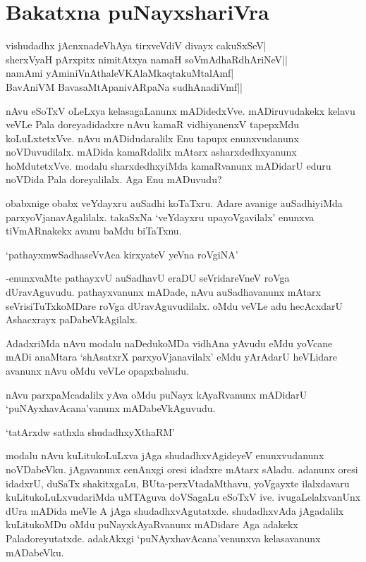 \chapter{Bakatxna puNayxshariVra}

\begin{shloka}
vishudadhx jAcnxnadeVhAya tirxveVdiV divayx cakuSxSeV|\\
sherxVyaH pArxpitx nimitAtxya namaH soVmAdhaRdhAriNeV||\\
namAmi yAminiVnAthaleVKAlaMkaqtakuMtalAmf|\\
BavAniVM BavasaMtApanivARpaNa sudhAnadiVmf||
\end{shloka}

nAvu eSoTxV oLeLxya kelasagaLanunx mADidedxVve. mADiruvudakekx kelavu veVLe Pala doreyadidadxre nAvu kamaR vidhiyanenxV tapepxMdu koLuLxtetxVve. nAvu mADidudaralilx Enu tapupx enunxvudanunx noVDuvudilalx. mADida kamaRdalilx mAtarx asharxdedhxyanunx hoMdutetxVve. modalu sharxdedhxyiMda kamaRvanunx mADidarU eduru noVDida Pala doreyalilalx. Aga Enu mADuvudu?

obabxnige obabx veYdayxru auSadhi koTaTxru. Adare avanige auSadhiyiMda parxyoVjanavAgalilalx. takaSxNa `veYdayxru upayoVgavilalx' enunxva tiVmARnakekx avanu baMdu biTaTxnu.

\begin{shloka}
`pathayxmwSadhaseVvAca kirxyateV yeVna roVgiNA' 
\end{shloka}

-enunxvaMte pathayxvU auSadhavU eraDU seVridareVneV roVga dUravAguvudu. pathayxvanunx mADade, nAvu auSadhavanunx mAtarx seVrisiTuTxkoMDare roVga dUravAguvudilalx. oMdu veVLe adu hecAcxdarU Ashacxrayx paDabeVkAgilalx.

AdadxriMda nAvu modalu naDedukoMDa vidhAna yAvudu eMdu yoVcane mADi anaMtara `shAsatxrX parxyoVjanavilalx' eMdu yArAdarU heVLidare avanunx nAvu oMdu veVLe opapxbahudu.

nAvu parxpaMcadalilx yAva oMdu puNayx kAyaRvanunx mADidarU `puNAyxhavAcana'vanunx mADabeVkAguvudu.

\begin{shloka}
`tatArxdw sathxla shudadhxyXthaRM'
\end{shloka}
 
modalu nAvu kuLitukoLuLxva jAga shudadhxvAgideyeV enunxvudanunx noVDabeVku. jAgavanunx cenAnxgi oresi idadxre mAtarx sAladu. adanunx oresi idadxrU, duSaTx shakitxgaLu, BUta-perxVtadaMthavu, yoVgayxte ilalxdavaru kuLitukoLuLxvudariMda uMTAguva doVSagaLu eSoTxV ive. ivugaLelalxvanUnx dUra mADida meVle A jAga shudadhxvAgutatxde. shudadhxvAda jAgadalilx kuLitukoMDu oMdu puNayxkAyaRvanunx mADidare Aga adakekx Paladoreyutatxde. adakAkxgi `puNAyxhavAcana'venunxva kelasavanunx mADabeVku.

